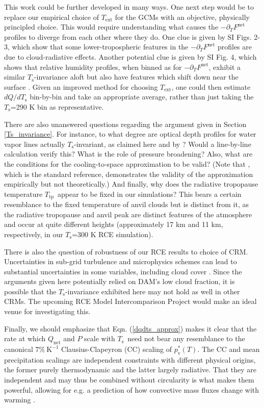 \documentclass[9pt,twocolumn,twoside,lineno]{pnas-new}
\newcommand{\eqnref}[1]{(\ref{#1})}
\newcommand{\ppt}{\ensuremath{\partial_T}}
\newcommand{\Qnet}{\ensuremath{Q_\mathrm{net}}}
\newcommand{\Fnet}{\ensuremath{F^\mathrm{net}}}
\newcommand{\Kinverse}{\ensuremath{\mathrm{K^{-1}}}}
\newcommand{\pvstar}{\ensuremath{p^*_{\mathrm{v}}}}
\newcommand{\Ts}{\ensuremath{T_\mathrm{s}}}
\newcommand{\Ttp}{\ensuremath{T_\mathrm{tp}}}
\newcommand{\Text}{\ensuremath{T_\mathrm{ext}}}
\begin{document}
 This work could be further developed in many ways. One next step would be to replace our empirical choice of $\Text$ for the GCMs with an objective, physically principled choice. This would require understanding what causes the $-\ppt\Fnet$ profiles to diverge from each other where they do. One clue is given by SI Figs. 2-3, which show that some lower-tropospheric features in the $-\ppt\Fnet$ profiles are due to cloud-radiative effects. Another potential clue is given by SI Fig. 4, which shows that  relative humidity profiles,  when binned as for $-\ppt \Fnet$, exhibit a similar \Ts-invariance aloft \citep[in line with the CRM results of][]{romps2014} but also have features which shift down near the surface \citep[see also][]{cronin2017}.  Given an improved method for choosing \Text, one could then estimate $dQ/d\Ts$ bin-by-bin and take an appropriate average, rather than just taking the \Ts=290 K bin as representative.
 
 There are also unanswered questions regarding the  argument given in Section \ref{Ts_invariance}. For instance, to what degree are optical depth profiles for water vapor lines actually \Ts-invariant, as claimed here and by \cite{ingram2010}? Would a line-by-line calculation verify this? What is the role of pressure broadening? Also, what are the conditions for the cooling-to-space approximation to be valid? (Note that \cite{rodgers1966}, which is the standard reference, demonstrates the validity of the approximation empirically but not theoretically.) And finally, why does  the radiative tropopause temperature \Ttp\ appear to be fixed in our simulations? This bears a certain resemblance to the fixed temperature of anvil clouds  but is distinct from it, as the radiative tropopause and anvil peak are distinct features of the atmosphere and occur at quite different heights (approximately 17 km and 11 km, respectively, in our \Ts=300 K RCE simulation).

There is also the question of robustness of our RCE results to choice of CRM. Uncertainties in sub-grid turbulence and microphysics schemes can lead to substantial uncertainties in some variables, including cloud cover \cite[e.g.][]{tsushima2015, igel2014}. Since the arguments given here potentially relied on DAM's  low cloud fraction, it is possible that the \Ts-invariance exhibited here may not hold as well in other CRMs. The upcoming RCE Model Intercomparison Project \cite[RCEMIP,][]{wing2017b} would make an ideal venue for investigating this.

Finally, we should emphasize that Eqn. \eqnref{dqdts_approx} makes it clear that the rate at which $\Qnet$ and $P$ scale with \Ts\ need not bear any resemblance to the  canonical $7\%\ \Kinverse$ Clausius-Clapeyron (CC) scaling of $\pvstar(T)$.  The CC and mean precipitation scalings  are independent constraints with different physical origins, the former purely thermodynamic and the latter largely radiative. That they are independent and may thus be combined without circularity is what makes them powerful, allowing for e.g. a prediction of how convective mass fluxes change with warming \cite[][]{held2006}.
\end{document}
